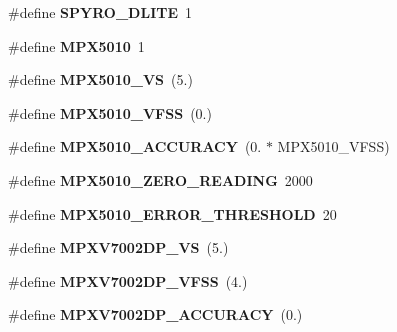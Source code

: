 \begin{DoxyCompactItemize}
\#define {\bfseries S\+P\+Y\+R\+O\+\_\+\+D\+L\+I\+TE}~1
\item 
\mbox{\label{group___ventilator_module_ga50aa7b43a2ede585b211377c0dca1345}} 
\#define {\bfseries M\+P\+X5010}~1
\item 
\mbox{\label{group___ventilator_module_gad7c62b0dbabcdfa22880642ba2c4b9fd}} 
\#define {\bfseries M\+P\+X5010\+\_\+\+VS}~(5.)
\item 
\mbox{\label{group___ventilator_module_gabcca82ad4193a80b89050938e3496944}} 
\#define {\bfseries M\+P\+X5010\+\_\+\+V\+F\+SS}~(0.)
\item 
\mbox{\label{group___ventilator_module_gaef66565e053ef9a998e879e81421e2e0}} 
\#define {\bfseries M\+P\+X5010\+\_\+\+A\+C\+C\+U\+R\+A\+CY}~(0. $\ast$ M\+P\+X5010\+\_\+\+V\+F\+SS)
\item 
\mbox{\label{group___ventilator_module_gab012f26c76f30c0e29c96a69e5b2928e}} 
\#define {\bfseries M\+P\+X5010\+\_\+\+Z\+E\+R\+O\+\_\+\+R\+E\+A\+D\+I\+NG}~2000
\item 
\mbox{\label{group___ventilator_module_gab86f6cdf16ad2b4ac02d1a4623512a71}} 
\#define {\bfseries M\+P\+X5010\+\_\+\+E\+R\+R\+O\+R\+\_\+\+T\+H\+R\+E\+S\+H\+O\+LD}~20
\item 
\mbox{\label{group___ventilator_module_ga9860c0a2f840e1461650a88f5d5e0d7a}} 
\#define {\bfseries M\+P\+X\+V7002\+D\+P\+\_\+\+VS}~(5.)
\item 
\mbox{\label{group___ventilator_module_gac3252f017dd0f63f7441d0e0d9cdcb8b}} 
\#define {\bfseries M\+P\+X\+V7002\+D\+P\+\_\+\+V\+F\+SS}~(4.)
\item 
\mbox{\label{group___ventilator_module_gaa260f137294bac4fa8401aa1f661daa9}} 
\#define {\bfseries M\+P\+X\+V7002\+D\+P\+\_\+\+A\+C\+C\+U\+R\+A\+CY}~(0.)
\item 
\mbox{\label{group___ventilator_module_gac3daf1855e2cc145ccc583f74162a2c9}} 

\end{DoxyCompactItemize}
